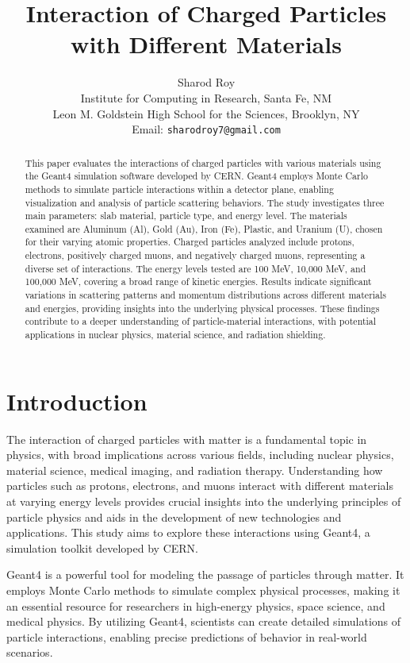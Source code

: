 \documentclass{article}
\title{Interaction of Charged Particles with Different Materials}
\author{Sharod Roy\\
        \small Institute for Computing in Research, Santa Fe, NM \\
        \small Leon M. Goldstein High School for the Sciences, Brooklyn, NY \\
        \small Email: \tt{sharodroy7@gmail.com} \\
}
\date{} %
\begin{document}
\maketitle

\begin{abstract} 
This paper evaluates the interactions of charged particles with various materials using the Geant4 simulation software developed by CERN. Geant4 employs Monte Carlo methods to simulate particle interactions within a detector plane, enabling visualization and analysis of particle scattering behaviors. The study investigates three main parameters: slab material, particle type, and energy level. The materials examined are Aluminum (Al), Gold (Au), Iron (Fe), Plastic, and Uranium (U), chosen for their varying atomic properties. Charged particles analyzed include protons, electrons, positively charged muons, and negatively charged muons, representing a diverse set of interactions. The energy levels tested are 100 MeV, 10,000 MeV, and 100,000 MeV, covering a broad range of kinetic energies. Results indicate significant variations in scattering patterns and momentum distributions across different materials and energies, providing insights into the underlying physical processes. These findings contribute to a deeper understanding of particle-material interactions, with potential applications in nuclear physics, material science, and radiation shielding.
\end{abstract}

\section{Introduction}

The interaction of charged particles with matter is a fundamental topic in physics, with broad implications across various fields, including nuclear physics, material science, medical imaging, and radiation therapy. Understanding how particles such as protons, electrons, and muons interact with different materials at varying energy levels provides crucial insights into the underlying principles of particle physics and aids in the development of new technologies and applications. This study aims to explore these interactions using Geant4, a simulation toolkit developed by CERN.

Geant4 is a powerful tool for modeling the passage of particles through matter. It employs Monte Carlo methods to simulate complex physical processes, making it an essential resource for researchers in high-energy physics, space science, and medical physics. By utilizing Geant4, scientists can create detailed simulations of particle interactions, enabling precise predictions of behavior in real-world scenarios.
\end{document}
